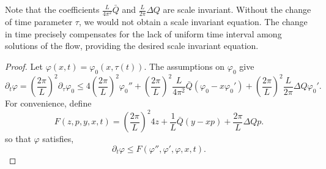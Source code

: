\documentclass[12pt]{amsart}
\begin{document}
\begin{remark}
Note that the coefficients $\tfrac{L}{4\pi^2} \bar{Q}$ and $\tfrac{L}{2\pi}\Delta Q$ are scale invariant. Without the change of time parameter $\tau$, we would not obtain a scale invariant equation. The change in time precisely compensates for the lack of uniform time interval among solutions of the flow, providing the desired scale invariant equation.
\end{remark}

\begin{proof}
Let $\varphi(x, t) = \varphi_0(x, \tau(t))$. The assumptions on $\varphi_0$ give
\[
\partial_t \varphi = \left(\frac{2\pi}{L}\right)^2 \partial_{\tau} \varphi_0 \leq 4 \left(\frac{2\pi}{L}\right)^2 \varphi_0'' + \left(\frac{2\pi}{L}\right)^2 \frac{L}{4\pi^2} \bar{Q} (\varphi_0 - x \varphi_0') + \left(\frac{2\pi}{L}\right)^2 \frac{L}{2\pi} \Delta Q \varphi_0'.
\]
For convenience, define
\[
F(z, p, y, x, t) = \left(\frac{2\pi}{L}\right)^2 4 z + \frac{1}{L} \bar{Q} (y - x p) + \frac{2\pi}{L} \Delta Q p.
\]
so that $\varphi$ satisfies,
\begin{equation}
\label{eq:comparison_diff_ineq_leq}
\partial_t \varphi \leq F(\varphi'', \varphi', \varphi, x, t).
\end{equation}


\end{proof}
\end{document}
